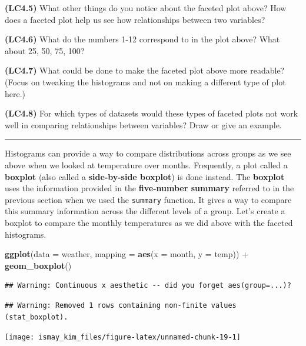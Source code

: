 \documentclass[]{tufte-book}
\newenvironment{Shaded}{\begin{snugshade}}{\end{snugshade}}
\newcommand{\KeywordTok}[1]{\textcolor[rgb]{0.13,0.29,0.53}{\textbf{{#1}}}}
\newcommand{\DataTypeTok}[1]{\textcolor[rgb]{0.13,0.29,0.53}{{#1}}}
\newcommand{\StringTok}[1]{\textcolor[rgb]{0.31,0.60,0.02}{{#1}}}
\newcommand{\NormalTok}[1]{{#1}}
\begin{document}
\textbf{(LC4.5)} What other things do you notice about the faceted plot
above? How does a faceted plot help us see how relationships between two
variables?

\textbf{(LC4.6)} What do the numbers 1-12 correspond to in the plot
above? What about 25, 50, 75, 100?

\textbf{(LC4.7)} What could be done to make the faceted plot above more
readable? (Focus on tweaking the histograms and not on making a
different type of plot here.)

\textbf{(LC4.8)} For which types of datasets would these types of
faceted plots not work well in comparing relationships between
variables? Draw or give an example.

\begin{center}\rule{0.5\linewidth}{\linethickness}\end{center}

Histograms can provide a way to compare distributions across groups as
we see above when we looked at temperature over months. Frequently, a
plot called a \textbf{boxplot} (also called a \textbf{side-by-side
boxplot}) is done instead. The \textbf{boxplot} uses the information
provided in the \textbf{five-number summary} referred to in the previous
section when we used the \texttt{summary} function. It gives a way to
compare this summary information across the different levels of a group.
Let's create a boxplot to compare the monthly temperatures as we did
above with the faceted histograms.

\begin{Shaded}
\begin{Highlighting}[]
\KeywordTok{ggplot}\NormalTok{(}\DataTypeTok{data =} \NormalTok{weather, }\DataTypeTok{mapping =} \KeywordTok{aes}\NormalTok{(}\DataTypeTok{x =} \NormalTok{month, }\DataTypeTok{y =} \NormalTok{temp)) +}
\StringTok{  }\KeywordTok{geom_boxplot}\NormalTok{()}
\end{Highlighting}
\end{Shaded}

\begin{verbatim}
## Warning: Continuous x aesthetic -- did you forget aes(group=...)?
\end{verbatim}

\begin{verbatim}
## Warning: Removed 1 rows containing non-finite values (stat_boxplot).
\end{verbatim}

\texttt{[image: ismay\_kim\_files/figure-latex/unnamed-chunk-19-1]}
\end{document}
